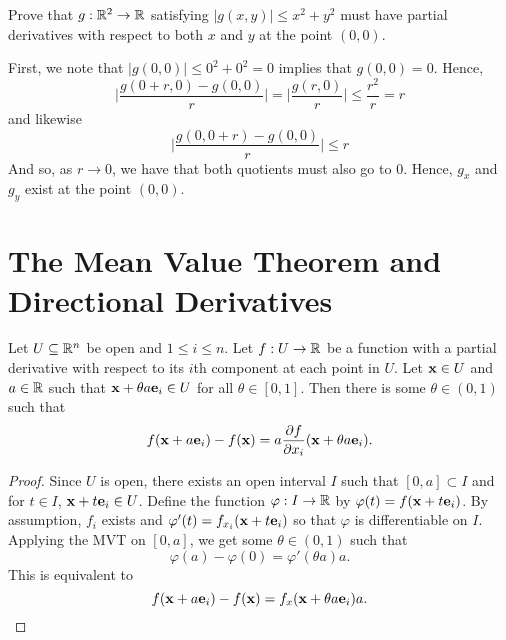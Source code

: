 \documentclass[letterpaper, twoside, 12pt]{book}
\begin{document}
\begin{exercise}[4]
  Prove that \(g:\mathbb R^2\to\mathbb R\) satisfying \(|g(x,y)|\leq x^2+y^2\)
  must have partial derivatives with respect to both \(x\) and \(y\)
  at the point \((0,0)\).
\end{exercise}

\begin{solution}
    First, we note that \( |g(0,0)| \leq 0^2 + 0^2 = 0\) implies that
    \(g(0,0) = 0\). Hence,
    \[ \bigg| \frac{g(0 + r, 0) - g(0,0)}{r} \bigg| 
    = \bigg| \frac{g(r,0)}{r} \bigg| \leq \frac{r^2}{r} = r \]
    and likewise
    \[ \bigg| \frac{g(0, 0 + r) - g(0,0)}{r} \bigg| \leq r \]
    And so, as \(r \to 0\), we have that both quotients must
    also go to \(0\). Hence, \(g_x\) and \(g_y\) exist at the
    point \((0,0)\).
\end{solution}


\section{The Mean Value Theorem and Directional Derivatives}

\begin{lemma}
  Let \(U\subseteq\mathbb R^n\) be open and \(1\leq i\leq n\). Let
  \(f:U\to\mathbb R\) be a function with a partial derivative with respect to its
  \(i\)th component at each point in \(U\). Let \(\mathbf x\in U\) and
  \(a\in\mathbb R\) such that \(\mathbf x+\theta a\mathbf e_i\in U\) for all
  \(\theta\in[0,1]\). Then there is some \(\theta\in(0,1)\) such that
  \[
    f(\mathbf x+a\mathbf e_i)
      -
    f(\mathbf x)
      =
    a\frac{\partial f}{\partial x_i}(\mathbf x+\theta a\mathbf e_i)
  .\]
\end{lemma}

\begin{proof}
    Since \(U\) is open, there exists an open interval \(I\) such
    that \([0, a] \subset I\) and for \(t \in I\), 
    \(\mathbf x + t\mathbf e_i \in U\). Define the function 
    \(\varphi: I \to \mathbb R\) by \(\varphi(t) = f(\mathbf x + t \mathbf e_i)\).
    By assumption, \(f_i\) exists and 
    \(\varphi'(t) = f_{x_i}(\mathbf x + t \mathbf e_i)\) so that
    \(\varphi\) is differentiable on \(I\). Applying the MVT on
    \([0, a]\), we get some \(\theta \in (0, 1)\) such that
    \[ \varphi(a) - \varphi(0) = \varphi'(\theta a)a .\]
    This is equivalent to
    \[ f(\mathbf x + a\mathbf e_i) - f(\mathbf x) = f_x(\mathbf x + \theta a\mathbf e_i)a .\]
\end{proof}
\end{document}
